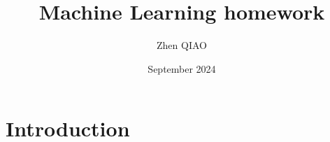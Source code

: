\documentclass{article}
\title{Machine Learning homework}
\author{Zhen QIAO}
\date{September 2024}
\begin{document}
\maketitle

\section{Introduction}
\end{document}
